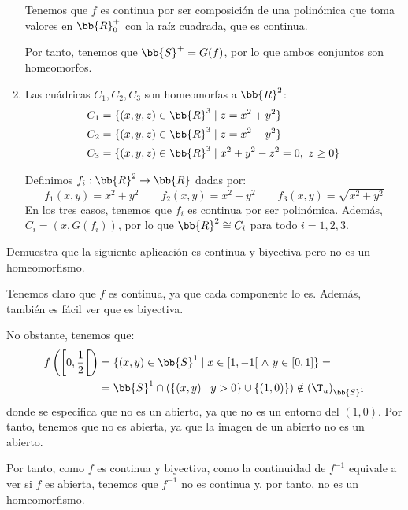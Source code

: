 \begin{ejercicio}
\begin{enumerate}
        Tenemos que $f$ es continua por ser composición de una polinómica que toma valores en $\bb{R}^+_0$ con la raíz cuadrada, que es continua.

        Por tanto, tenemos que $\bb{S}^+=G(f)$, por lo que ambos conjuntos son homeomorfos.
        
        \item Las cuádricas $C_1,C_2,C_3$ son homeomorfas a $\bb{R}^2$:
        \begin{equation*}\begin{split}
            C_1 &= \{(x, y, z) \in \bb{R}^3 \mid z = x^2+y^2\}\\
            C_2 &= \{(x, y, z) \in \bb{R}^3 \mid z = x^2-y^2\}\\
            C_3 &= \{(x, y, z) \in \bb{R}^3 \mid x^2 + y^2 - z^2 = 0,~ z \geq 0\}
        \end{split}\end{equation*}

        Definimos $f_i:\bb{R}^2\to \bb{R}$ dadas por:
        \begin{equation*}
            f_1(x,y) = x^2+y^2\qquad f_2(x,y)=x^2-y^2\qquad f_3(x,y)=\sqrt{x^2+y^2}
        \end{equation*}
        En los tres casos, tenemos que $f_i$ es continua por ser polinómica. Además,
        $C_i=(x,G(f_i))$, por lo que $\bb{R}^2\cong C_i$ para todo $i=1,2,3$.
    \end{enumerate}
\end{ejercicio}

\begin{ejercicio}
    Demuestra que la siguiente aplicación es continua y biyectiva pero no es un homeomorfismo.
    \Func{f}{\left([0, 1[,{(\T_u)}_{[0,1[}\right)}{(\bb{S}^1,{(\T_u)}_{\bb{S}^1})}{t}{(\cos(2\pi t),\sen(2\pi t))}

    Tenemos claro que $f$ es continua, ya que cada componente lo es. Además, también es fácil ver que es biyectiva.

    No obstante, tenemos que:
    \begin{equation*}
        \begin{split}
            f\left(\left[0,\frac{1}{2}\right[\right) &= \{(x,y)\in \bb{S}^1 \mid x\in [1,-1[ ~\land~y\in [0,1] \} =\\&= \bb{S}^1 \cap \left(\{(x,y)\mid y>0\} \cup \{(1,0)\}\right)\notin {(\T_u)}_{\bb{S}^1}
        \end{split}
    \end{equation*}
    donde se especifica que no es un abierto, ya que no es un entorno del $(1,0)$. Por tanto, tenemos que no es abierta, ya que la imagen de un abierto no es un abierto.

     Por tanto, como $f$ es continua y biyectiva, como la continuidad de $f^{-1}$ equivale a ver si $f$ es abierta, tenemos que $f^{-1}$ no es continua y, por tanto, no es un homeomorfismo.
\end{ejercicio}

